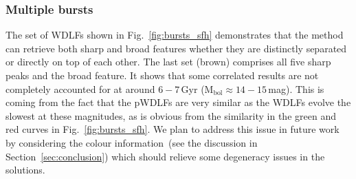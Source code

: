 \documentclass[fleqn,usenatbib]{mnras}
\begin{document}
\subsubsection*{Multiple bursts}
The set of WDLFs shown in Fig.~\ref{fig:bursts_sfh} demonstrates that the method
can retrieve both sharp and
broad features whether they are distinctly separated or directly on top of each
other. The last set (brown) comprises all five sharp peaks and the broad
feature. It shows that some correlated results are not completely
accounted for at around $6-7$\,Gyr (M$_\mathrm{bol}\approx14-15$\,mag). This is
coming from the fact that the pWDLFs are very similar as the WDLFs evolve the
slowest at these magnitudes, as is obvious from the similarity in the green and
red curves in Fig.~\ref{fig:bursts_sfh}. We plan to address this issue in future
work by considering the colour information~(see the discussion in 
Section~\ref{sec:conclusion}) which should relieve some degeneracy issues in the
solutions.
\end{document}
